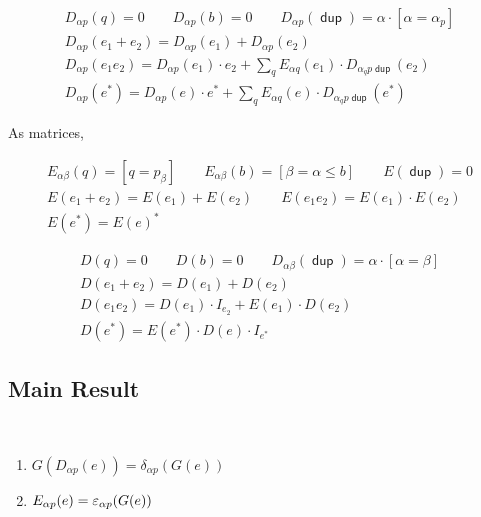 \documentclass{article}
\newcommand\ssum{\mathop{\textstyle\sum}}
\newcommand\pdup{\mathop{\mathsf{dup}}}
\newcommand\bval[1]{[#1]}
\renewcommand\star{^{\textstyle *}}
\begin{document}
\begin{gather*}
D_{\alpha p}(q) = 0 \qquad
D_{\alpha p}(b) = 0 \qquad
D_{\alpha p}(\pdup) = \alpha\cdot\bval{\alpha=\alpha_p}\\
D_{\alpha p}(e_1+e_2) = D_{\alpha p}(e_1)+D_{\alpha p}(e_2)\\
D_{\alpha p}(e_1e_2) = D_{\alpha p}(e_1)\cdot e_2 + \ssum_{q} E_{\alpha q}(e_1)\cdot D_{\alpha_qp\pdup}(e_2)\\
D_{\alpha p}(e\star) = D_{\alpha p}(e)\cdot e\star + \ssum_{q} E_{\alpha q}(e)\cdot D_{\alpha_qp\pdup}(e\star)
\end{gather*}

As matrices,

\begin{gather*}
E_{\alpha\beta}(q) = \bval{q = p_\beta} \qquad
E_{\alpha\beta}(b) = \bval{\beta=\alpha\leq b} \qquad
E(\pdup) = 0\\
E(e_1+e_2) = E(e_1)+E(e_2) \qquad
E(e_1e_2) = E(e_1)\cdot E(e_2)\\
E(e\star) = E(e)\star
\end{gather*}

\begin{gather*}
D(q) = 0 \qquad
D(b) = 0 \qquad
D_{\alpha\beta}(\pdup) = \alpha\cdot\bval{\alpha=\beta}\\
D(e_1+e_2) = D(e_1)+D(e_2)\\
D(e_1e_2) = D(e_1)\cdot I_{e_2} + E(e_1)\cdot D(e_2)\\
D(e\star) = E(e\star)\cdot D(e)\cdot I_{e^*}
\end{gather*}

\subsection*{Main Result}

\begin{lemma}\ 
\begin{enumerate}
\romanize
\item
$G(D_{\alpha p}(e)) = \delta_{\alpha p}(G(e))$
\item
$E_{\alpha p}(e) = \varepsilon_{\alpha p}(G(e))$
\end{enumerate}
\end{lemma}
\end{document}
